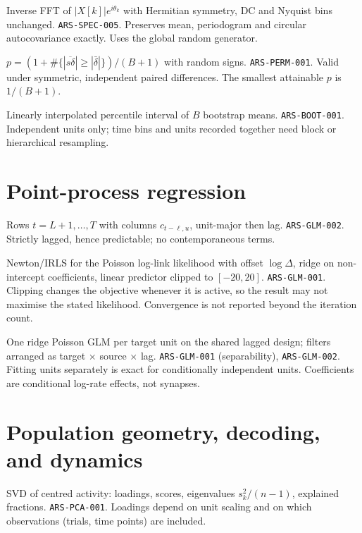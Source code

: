 {Inverse FFT of $|X[k]|e^{i\theta_k}$ with Hermitian symmetry, DC and Nyquist bins unchanged.}
{\texttt{ARS-SPEC-005}.}
{Preserves mean, periodogram and circular autocovariance exactly. Uses the global random generator.}

{$p=(1+\#\{|\overline{s\delta}|\ge|\bar\delta|\})/(B+1)$ with random signs.}
{\texttt{ARS-PERM-001}.}
{Valid under symmetric, independent paired differences. The smallest attainable $p$ is $1/(B+1)$.}

{Linearly interpolated percentile interval of $B$ bootstrap means.}
{\texttt{ARS-BOOT-001}.}
{Independent units only; time bins and units recorded together need block or hierarchical resampling.}

\section{Point-process regression}
{Rows $t=L+1,\dots,T$ with columns $c_{t-\ell,u}$, unit-major then lag.}
{\texttt{ARS-GLM-002}.}
{Strictly lagged, hence predictable; no contemporaneous terms.}

{Newton/IRLS for the Poisson log-link likelihood with offset $\log\Delta$, ridge on non-intercept coefficients, linear predictor clipped to $[-20,20]$.}
{\texttt{ARS-GLM-001}.}
{Clipping changes the objective whenever it is active, so the result may not maximise the stated likelihood. Convergence is not reported beyond the iteration count.}

{One ridge Poisson GLM per target unit on the shared lagged design; filters arranged as target $\times$ source $\times$ lag.}
{\texttt{ARS-GLM-001} (separability), \texttt{ARS-GLM-002}.}
{Fitting units separately is exact for conditionally independent units. Coefficients are conditional log-rate effects, not synapses.}

\section{Population geometry, decoding, and dynamics}
{SVD of centred activity: loadings, scores, eigenvalues $s_k^2/(n-1)$, explained fractions.}
{\texttt{ARS-PCA-001}.}
{Loadings depend on unit scaling and on which observations (trials, time points) are included.}

